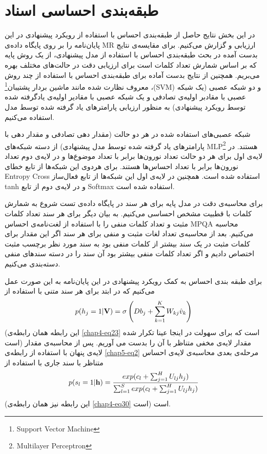 \section{طبقه‌بندی احساسی اسناد}
\label{chap5sec9}
در این بخش نتایج حاصل از طبقه‌بندی احساس با استفاده از رویکرد پیشنهادی در این پایان‌‌نامه را بر روی پایگاه داده‌ی
MR
ارزیابی و گزارش می‌‌کنیم. برای مقایسه‌ی نتایج بدست آمده در بحث طبقه‌بندی احساس با استفاده از مدل پیشنهادی، از یک روش پایه که بر اساس شمارش تعداد کلمات است برای ارزیابی دقت در حالت‌های مختلف بهره می‌‌بریم. همچنین از نتایج بدست آماده برای طبقه‌بندی احساس با استفاده از چند روش معروف نظارت شده مانند ماشین بردار پشتیبان\footnote{Support Vector Machine}
،(SVM)
و دو شبکه عصبی (یک شبکه‌ عصبی با مقادبر اولیه‌ی تصادفی و یک شبکه‌ عصبی با مقادیر اولیه‌ی یادگرفته شده توسط رویکرد پیشنهادی) به منظور ارزیابی پارامترهای یاد گرفته شده توسط مدل استفاده می‌کنیم.

شبکه عصبی‌های استفاده شده در هر دو حالت (مقدار دهی تصادفی و مقدار دهی با پارامترهای یاد گرفته شده توسط مدل پیشنهادی) از دسته شبکه‌های 
MLP\footnote{Multilayer Perceptron}
هستند. در لایه‌ی اول برای هر دو حالت تعداد نورون‌ها برابر با تعداد موضوع‌ها و در لایه‌ی دوم تعداد نورون‌ها برابر با تعداد احساس‌ها هستند. برای هردوی این شبکه‌ها از تابع خطای
Entropy Cross 
استفاده شده است. همچنین در لایه‌ی اول این شبکه‌ها از تابع فعال‌ساز 
tanh
و در لایه‌ی دوم از تابع
Softmax
استفاده شده است.
%

برای محاسبه‌ی دقت در مدل پایه برای هر سند در پایگاه داده‌ی تست شروع به شمارش کلمات با قطبیت مشخص احساسی‌ می‌‌کنیم. به بیان دیگر برای هر سند تعداد کلمات مثبت و تعداد کلمات منفی را با استفاده از لغت‌نامه‌ی احساس
MPQA
محاسبه می‌کنیم. بعد از محاسبه‌ی تعداد لغات مثبت و منفی‌ برای هر سند اگر این مقدار برای کلمات مثبت در یک سند بیشتر از کلمات منفی‌ بود به سند مورد نظر برچسب مثبت اختصاص دادیم و اگر تعداد کلمات منفی‌ بیشتر بود آن سند را در دسته سندهای منفی‌ دسته‌بندی می‌کنیم.

برای طبقه بندی احساس به کمک رویکرد پیشنهادی در این پایان‌‌نامه به این صورت عمل می‌کنیم که در ابتد برای هر سند متنی با استفاده از
\begin{align}
	\centering
	\label{chap5-eq2}
	p(h_{j}=1|\textbf{V})=\sigma \left( Db_j + \sum_{k=1}^{K}W_{kj}\hat{v}_k \right)
\end{align}
(این رابطه‌ همان رابطه‌ی \ref{chap4-eq23} است که برای سهولت در اینجا عینا تکرار شده است) مقدار لایه‌ی مخفی متناظر با آن را بدست می آوریم. پس از محاسبه‌ی مقدار لایه‌ی پنهان با استفاده از رابطه‌ی
\ref{chap5-eq2}
مرحله‌ی بعدی محاسبه‌ی لایه‌ی احساس متناظر با سند جاری با استفاده از
\begin{align}
	\centering
	\label{chap5-eq3}
	p(s_{l}=1|\textbf{h})=\dfrac{exp(c_{l}+\sum_{j=1}^{H}U_{lj}h_j)}{\sum_{l=1}^{S}exp(c_{l}+\sum_{j=1}^{H}U_{lj}h_j)}
\end{align}
(این رابطه‌ نیز همان رابطه‌‌ی \ref{chap4-eq30} است)
است. 

